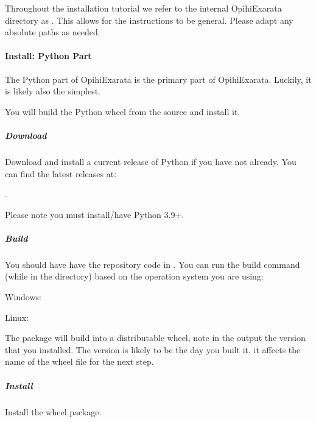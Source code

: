 \documentclass[letterpaper,11pt,english]{sphinxmanual}
\begin{document}
\sphinxAtStartPar
Throughout the installation tutorial we refer to the internal OpihiExarata
directory as . This allows for the instructions to be
general. Please adapt any absolute paths as needed.

\sphinxstepscope


\paragraph{Install: Python Part}
\label{\detokenize{technical/installation/python:install-python-part}}\label{\detokenize{technical/installation/python:technical-installation-python-part}}\label{\detokenize{technical/installation/python::doc}}
\sphinxAtStartPar
The Python part of OpihiExarata is the primary part of OpihiExarata. Luckily,
it is likely also the simplest.

\sphinxAtStartPar
You will build the Python wheel from the source and install it.


\subparagraph{Download}
\label{\detokenize{technical/installation/python:download}}
\sphinxAtStartPar
Download and install a current release of Python if you have not already. You
can find the latest releases at: %
\begin{footnote}[27]\sphinxAtStartFootnote
{}
%
\end{footnote}.

\sphinxAtStartPar
Please note you must install/have Python 3.9+.


\subparagraph{Build}
\label{\detokenize{technical/installation/python:build}}
\sphinxAtStartPar
You should have have the repository code in . You can
run the build command (while in the directory) based on the operation system
you are using:

\sphinxAtStartPar
Windows: 

\sphinxAtStartPar
Linux: 

\sphinxAtStartPar
The package will build into a distributable wheel, note in the output the
version that you installed. The version is likely to be the day you built it,
it affects the name of the wheel file for the next step.


\subparagraph{Install}
\label{\detokenize{technical/installation/python:install}}
\sphinxAtStartPar
Install the wheel package.
\end{document}
